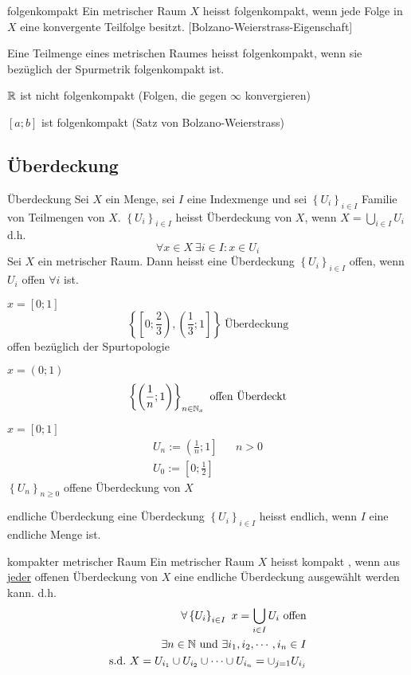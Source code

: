 \begin{Def}{folgenkompakt}
  Ein metrischer Raum $X$ heisst folgenkompakt, wenn jede Folge in $X$ eine konvergente Teilfolge besitzt. [Bolzano-Weierstrass-Eigenschaft]
\end{Def}
\begin{Def}
  Eine Teilmenge eines metrischen Raumes heisst folgenkompakt, wenn sie bezüglich der Spurmetrik folgenkompakt ist.
\end{Def}
\begin{Bsp}
    $\mathbb{R}$ ist nicht folgenkompakt (Folgen, die gegen $\infty$ konvergieren)
\end{Bsp}
\begin{Bsp}
    $[a;b]$ ist folgenkompakt (Satz von Bolzano-Weierstrass)
\end{Bsp}
\subsection{Überdeckung}
\begin{Def}{Überdeckung}
  Sei $X$ ein Menge, sei $I$ eine Indexmenge und sei $\left\{ U_i \right\}_{i\in I}$ Familie von Teilmengen von $X$. $\left\{ U_i \right\}_{i\in I}$ heisst Überdeckung von $X$, wenn $X=\bigcup_{i\in I}U_i$ d.h.
  \[\forall x\in X\ \exists i\in I:x\in U_i\]
  Sei $X$ ein metrischer Raum. Dann heisst eine Überdeckung $\left\{ U_i \right\}_{i\in I}$ offen, wenn $U_i$ offen $\forall i$ ist.
\end{Def}
\begin{Bsp}
  $x=[0;1]$
  \[\left\{ \left[0;\frac{2}{3}\right),\left(\frac{1}{3};1\right] \right\}\ \text{Überdeckung}\]
  offen bezüglich der Spurtopologie
\end{Bsp}
\begin{Bsp}
  $x=(0;1)$
  \[\left\{ \left( \frac{1}{n};1 \right) \right\}_{n\in\mathbb{N}_x}\ \text{offen Überdeckt}\]
\end{Bsp}
\begin{Bsp}
  $x=[0;1]$
  \begin{align*}
    U_n:=\left( \frac{1}{n};1 \right]&& n>0\\
    U_0:=\left[ 0;\frac{1}{2} \right]
  \end{align*}
  $\left\{ U_n \right\}_{n\geq 0}$ offene Überdeckung von $X$
\end{Bsp}
\begin{Def}{endliche Überdeckung}
  eine Überdeckung $\left\{ U_i \right\}_{i\in I}$ heisst endlich, wenn $I$ eine endliche Menge ist.
\end{Def}
\begin{Def}{kompakter metrischer Raum}
  Ein metrischer Raum $X$ heisst kompakt , wenn aus \underline{jeder} offenen Überdeckung von $X$ eine endliche Überdeckung ausgewählt werden kann. d.h.
  \begin{align*}
  \forall \left\{ U_i \right\}_{i\in I}\ x=\bigcup_{i\in I}U_i\ \text{offen}\\
  \exists n\in \mb{N}\ \text{und}\ \exists i_1,i_2,\cdots,i_n\in I\\
  \text{s.d.}\ X=U_{i_1}\cup U_{i_2}\cup\cdots\cup U_{i_n}=\cup_{j=1}U_{i_j}
  \end{align*}
\end{Def}
